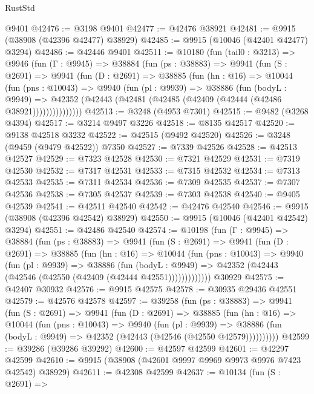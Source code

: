 \begin{lexlean}{RustStd}
\begin{coremodule}
    @9401
@42476 := @3198 @9401
@42477 := @42476 @38921
@42481 := @9915 (@38908 (@42396 @42477) @38929)
@42485 := @9915 (@10046 (@42401 @42477) @3294)
@42486 := @42446 @9401
@42511 := @10180
    (fun (tail0 : @3213) =>
    @9946
      (fun (Γ : @9945) =>
      @38884
        (fun (ps : @38883) =>
        @9941
          (fun (S : @2691) =>
          @9941
            (fun (D : @2691) =>
            @38885
              (fun (hn : @16) =>
              @10044
                (fun (pns : @10043) =>
                @9940
                  (fun (pl : @9939) =>
                  @38886
                    (fun (bodyL : @9949) =>
                    @42352 (@42443 (@42481 (@42485 (@42409 (@42444 (@42486 @38921)))))))))))))))
@42513 := @3248 (@4953 @7301)
@42515 := @9482 (@3268 @4394)
@42517 := @3214 @9497 @3226
@42518 := @8135 @42517
@42520 := @9138 @42518 @3232
@42522 := @42515 (@9492 @42520)
@42526 := @3248 (@9459 (@9479 @42522)) @7350
@42527 := @7339 @42526
@42528 := @42513 @42527
@42529 := @7323 @42528
@42530 := @7321 @42529
@42531 := @7319 @42530
@42532 := @7317 @42531
@42533 := @7315 @42532
@42534 := @7313 @42533
@42535 := @7311 @42534
@42536 := @7309 @42535
@42537 := @7307 @42536
@42538 := @7305 @42537
@42539 := @7303 @42538
@42540 := @9405 @42539
@42541 := @42511 @42540
@42542 := @42476 @42540
@42546 := @9915 (@38908 (@42396 @42542) @38929)
@42550 := @9915 (@10046 (@42401 @42542) @3294)
@42551 := @42486 @42540
@42574 := @10198
    (fun (Γ : @9945) =>
    @38884
      (fun (ps : @38883) =>
      @9941
        (fun (S : @2691) =>
        @9941
          (fun (D : @2691) =>
          @38885
            (fun (hn : @16) =>
            @10044
              (fun (pns : @10043) =>
              @9940
                (fun (pl : @9939) =>
                @38886
                  (fun (bodyL : @9949) =>
                  @42352 (@42443 (@42546 (@42550 (@42409 (@42444 @42551)))))))))))))
    @30929
@42575 := @42407 @30932
@42576 := @9915 @42575
@42578 := @30935 @29436 @42551
@42579 := @42576 @42578
@42597 := @39258
    (fun (ps : @38883) =>
    @9941
      (fun (S : @2691) =>
      @9941
        (fun (D : @2691) =>
        @38885
          (fun (hn : @16) =>
          @10044
            (fun (pns : @10043) =>
            @9940
              (fun (pl : @9939) =>
              @38886 (fun (bodyL : @9949) => @42352 (@42443 (@42546 (@42550 @42579))))))))))
@42599 := @39286 (@39286 @39292)
@42600 := @42597 @42599
@42601 := @42297 @42599
@42610 := @9915 (@38908 (@42601 @9997 @9969 @9973 @9976 @7423 @42542) @38929)
@42611 := @42308 @42599
@42637 := @10134
    (fun (S : @2691) =>

\end{coremodule}
\end{lexlean}
